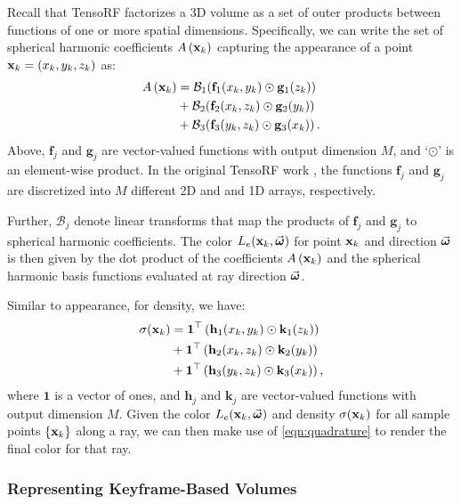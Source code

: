 \documentclass[10pt,twocolumn,letterpaper]{article}
\begin{document}
Recall that TensoRF factorizes a 3D volume as a set of outer products between functions of one or more spatial dimensions.
Specifically, we can write the set of spherical harmonic coefficients $A\left(\mathbf{x}_k\right)$ capturing the appearance of a point $\mathbf{x}_k = (x_k, y_k, z_k)$ as:
\begin{align}
    A\left(\mathbf{x}_k\right)
    &= \mathcal{B}_1 \!\left( \mathbf{f}_1(x_k, y_k) \odot \mathbf{g}_1(z_k) \right) \nonumber \\
    &+ \mathcal{B}_2 \!\left( \mathbf{f}_2(x_k, z_k) \odot \mathbf{g}_2(y_k) \right) \label{eqn:tensorappearancestatic} \\
    &+ \mathcal{B}_3 \!\left( \mathbf{f}_3(y_k, z_k) \odot \mathbf{g}_3(x_k) \right) \text{.} \nonumber
\end{align}
Above, $\mathbf{f}_j$ and $\mathbf{g}_j$ are vector-valued functions with output dimension $M$, and `$\odot$' is an element-wise product.
In the original TensoRF work \cite{ChenXGYS2022}, the functions $\mathbf{f}_j$ and $\mathbf{g}_j$ are discretized into $M$ different 2D and and 1D arrays, respectively.

Further, $\mathcal{B}_j$ denote linear transforms that map the products of $\mathbf{f}_j$ and $\mathbf{g}_j$ to spherical harmonic coefficients.
The color $L_e(\mathbf{x}_k, \vec{\boldsymbol{\omega}})$ for point $\mathbf{x}_k$ and direction $\vec{\boldsymbol{\omega}}$ is then given by the dot product of the coefficients $A\left(\mathbf{x}_k \right)$ and the spherical harmonic basis functions evaluated at ray direction $\vec{\boldsymbol{\omega}}$.

Similar to appearance, for density, we have:
\begin{align}
    \sigma(\mathbf{x}_k)
    &= \mathbf{1}^\top \left( \mathbf{h}_1(x_k, y_k) \odot \mathbf{k}_1(z_k) \right) \nonumber \\
    &+ \mathbf{1}^\top \left( \mathbf{h}_2(x_k, z_k) \odot \mathbf{k}_2(y_k) \right) \label{eqn:tensoropacitystatic} \\
    &+ \mathbf{1}^\top \left( \mathbf{h}_3(y_k, z_k) \odot \mathbf{k}_3(x_k) \right) \text{,} \nonumber
\end{align}
where $\mathbf{1}$ is a vector of ones, and $\mathbf{h}_j$ and $\mathbf{k}_j$ are vector-valued functions with output dimension $M$.
Given the color $L_e(\mathbf{x}_k, \vec{\boldsymbol{\omega}})$ and density $\sigma(\mathbf{x}_k)$ for all sample points $\{\mathbf{x}_k\}$ along a ray, we can then make use of \cref{eqn:quadrature} to render the final color for that ray.


\subsubsection{Representing Keyframe-Based Volumes}
\label{sec:keyframe}
\end{document}
